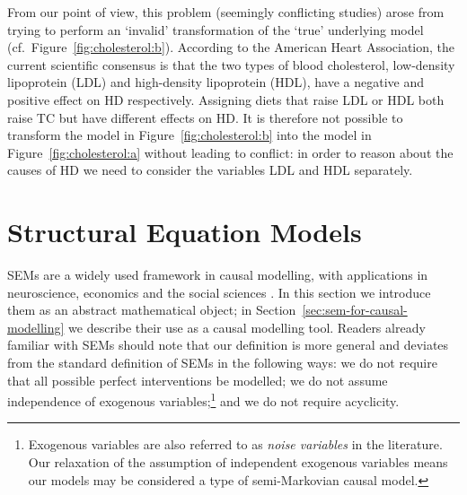 From our point of view, this problem (seemingly conflicting studies) arose from trying to perform an `invalid' transformation of the `true' underlying model (cf.\ Figure~\ref{fig:cholesterol:b}).
According to the American Heart Association, the current scientific consensus is that the two types of blood cholesterol, low-density lipoprotein (LDL) and high-density lipoprotein (HDL), have a negative and positive effect on HD respectively.
Assigning diets that raise LDL or HDL both raise TC but have different effects on HD\@.
It is therefore not possible to transform the model in Figure~\ref{fig:cholesterol:b} into the model in Figure~\ref{fig:cholesterol:a} without leading to conflict:
in order to reason about the causes of HD we need to consider the variables LDL and HDL separately.





\section{Structural Equation Models}\label{sec:SEMs}

SEMs are a widely used framework in causal modelling, with applications in neuroscience, economics and the social sciences \citep{pearl2009causality,bollen2014structural}. In this section we introduce them as an abstract mathematical object; in Section~\ref{sec:sem-for-causal-modelling} we describe their use as a causal modelling tool.
Readers already familiar with SEMs should note that our definition is more general and deviates from the standard definition of SEMs in the following ways: we do not require that all possible perfect interventions be modelled; we do not assume independence of exogenous variables;\footnote{Exogenous variables are also referred to as \emph{noise variables} in the literature. Our relaxation of the assumption of independent exogenous variables means our models may be considered a type of semi-Markovian causal model.} and we do not require acyclicity.
%

